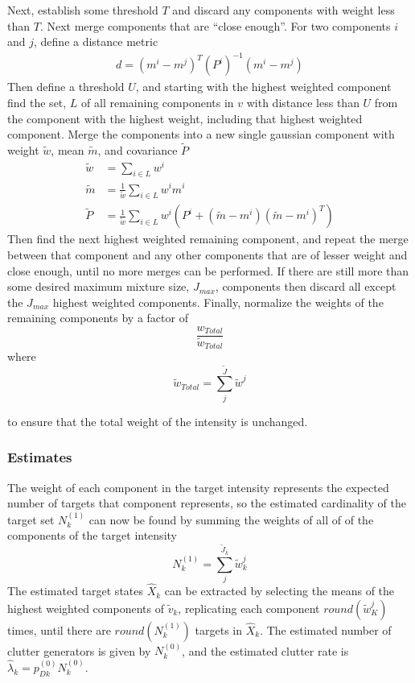 \documentclass{article}
\begin{document}
Next, establish some threshold $T$ and discard any components with weight less than $T$. Next merge components that are ``close enough''. For two components $i$ and $j$, define a distance metric
\begin{align}
  \label{eq:gauss_dist}
  d = (m^i - m^j)^T(P^i)^{-1}(m^i - m^j)
\end{align}
Then define a threshold $U$, and starting with the highest weighted component find the set, $L$ of all remaining components in $v$ with distance less than $U$ from the component with the highest weight, including that highest weighted component. Merge the components into a new single gaussian component with weight $\tilde{w}$, mean $\tilde{m}$, and covariance $\tilde{P}$
\begin{align}
  \tilde{w} &= \sum_{i \in L}w^i \label{eq:gauss_merge_w}\\
  \tilde{m} &= \frac{1}{\tilde{w}}\sum_{i \in L}w^im^i \label{eq:gauss_merge_m}\\
  \tilde{P} &= \frac{1}{\tilde{w}}\sum_{i \in L}w^i(P^i + (\tilde{m} - m^i)(\tilde{m} - m^i)^T) \label{eq:gauss_merge_P}
\end{align}
Then find the next highest weighted remaining component, and repeat the merge between that component and any other components that are of lesser weight and close enough, until no more merges can be performed. If there are still more than some desired maximum mixture size, $J_{max}$, components then discard all except the $J_{max}$ highest weighted components. Finally, normalize the weights of the remaining components by a factor of
\begin{equation}
  \label{eq:wnorm}
  \frac{w_{Total}}{\tilde{w}_{Total}}
\end{equation}
where
\begin{equation}
  \label{eq:wtild_total}
  \tilde{w}_{Total} = \sum_j^{\tilde{J}}\tilde{w}^j
\end{equation}

to ensure that the total weight of the intensity is unchanged.

\subsubsection{Estimates}
The weight of each component in the target intensity represents the expected number of targets that component represents, so the estimated cardinality of the target set $N_k^{(1)}$ can now be found by summing the weights of all of of the components of the target intensity
\begin{equation}
  \label{eq:N1k}
  N_k^{(1)} = \sum_j^{\tilde{J}_k}\tilde{w}_k^j
\end{equation}
The estimated target states $\hat{X}_k$ can be extracted by selecting the means of the highest weighted components of $\tilde{v}_k$, replicating each component $round(\tilde{w}_K^j)$ times, until there are $round(N_k^{(1)})$ targets in $\hat{X}_k$. The estimated number of clutter generators is given by $N_k^{(0)}$, and the estimated clutter rate is $\hat{\lambda}_k = p_{Dk}^{(0)}N_k^{(0)}$.
\end{document}
